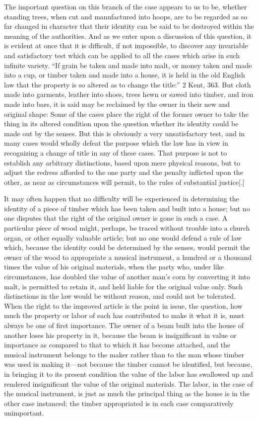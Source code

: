 The important question on this branch of the case appears to us to be, whether
standing trees, when cut and manufactured into hoops, are to be regarded as so
far changed in character that their identity can be said to be destroyed within
the meaning of the authorities. And as we enter upon a discussion of this
question, it is evident at once that it is difficult, if not impossible, to
discover any invariable and satisfactory test which can be applied to all the
cases which arise in such infinite variety. ``If grain be taken and made into
malt, or money taken and made into a cup, or timber taken and made into a
house, it is held in the old English law that the property is so altered as to
change the title:'' 2 Kent, 363. But cloth made into garments, leather into
shoes, trees hewn or sawed into timber, and iron made into bars, it is said may
be reclaimed by the owner in their new and original shape: Some of the cases
place the right of the former owner to take the thing in its altered condition
upon the question whether its identity could be made out by the senses. But
this is obviously a very unsatisfactory test, and in many cases would wholly
defeat the purpose which the law has in view in recognizing a change of title
in any of these cases. That purpose is not to establish any arbitrary
distinctions, based upon mere physical reasons, but to adjust the redress
afforded to the one party and the penalty inflicted upon the other, as near as
circumstances will permit, to the rules of substantial justice[.]

It may often happen that no difficulty will be experienced in determining the
identity of a piece of timber which has been taken and built into a house; but
no one disputes that the right of the original owner is gone in such a case. A
particular piece of wood might, perhaps, be traced without trouble into a
church organ, or other equally valuable article; but no one would defend a rule
of law which, because the identity could be determined by the senses, would
permit the owner of the wood to appropriate a musical instrument, a hundred or
a thousand times the value of his original materials, when the party who, under
like circumstances, has doubled the value of another man's corn by converting
it into malt, is permitted to retain it, and held liable for the original value
only. Such distinctions in the law would be without reason, and could not be
tolerated. When the right to the improved article is the point in issue, the
question, how much the property or labor of each has contributed to make it
what it is, must always be one of first importance. The owner of a beam built
into the house of another loses his property in it, because the beam is
insignificant in value or importance as compared to that to which it has become
attached, and the musical instrument belongs to the maker rather than to the
man whose timber was used in making it---not because the timber cannot be
identified, but because, in bringing it to its present condition the value of
the labor has swallowed up and rendered insignificant the value of the original
materials. The labor, in the case of the musical instrument, is just as much
the principal thing as the house is in the other case instanced; the timber
appropriated is in each case comparatively unimportant.

